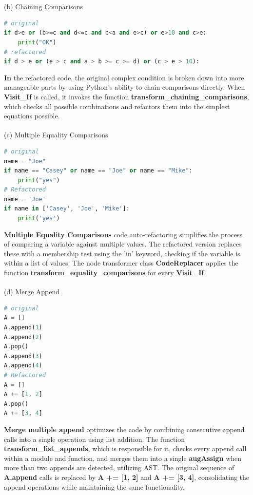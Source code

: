\documentclass[11pt]{article}
\begin{document}
\\ \\
(b) Chaining Comparisons
\begin{lstlisting}[language=python]
# original
if d>e or (b>=c and d<=c and b<a and e>c) or e>10 and c>e:
    print("OK")
# refactored
if d > e or (e > c and a > b >= c >= d) or (c > e > 10):
\end{lstlisting}
\textbf {In} the refactored code, the original complex condition is broken down into more manageable parts by using Python's ability to chain comparisons directly. When \textbf{Visit\_If} is called, it invokes the function \textbf{transform\_chaining\_comparisons}, which checks all possible combinations and refactors them into the simplest equations possible.\\ \\
(c) Multiple Equality Comparisons
\begin{lstlisting}[language=python]
# original
name = "Joe"
if name == "Casey" or name == "Joe" or name == "Mike":
    print("yes")
# Refactored
name = 'Joe'
if name in ['Casey', 'Joe', 'Mike']:
    print('yes')
\end{lstlisting}
\textbf{Multiple Equality Comparisons} code auto-refactoring simplifies the process of comparing a variable against multiple values. The refactored version replaces these with a membership test using the 'in' keyword, checking if the variable is within a list of values. The node transformer class \textbf{CodeReplacer} applies the function \textbf{transform\_equality\_comparisons} for every \textbf{Visit\_If}. \\ \\
(d) Merge Append
\begin{lstlisting}[language=python]
# original
A = []
A.append(1)
A.append(2)
A.pop()
A.append(3)
A.append(4)
# Refactored
A = []
A += [1, 2]
A.pop()
A += [3, 4]
\end{lstlisting}
\textbf{Merge multiple append} optimizes the code by combining consecutive append calls into a single operation using list addition. The function \textbf{transform\_list\_appends}, which is responsible for it, checks every append call within a module and function, and merges them into a single \textbf{augAssign} when more than two appends are detected, utilizing AST. The original sequence of \textbf{A.append} calls is replaced by \textbf{A += [1, 2]} and \textbf{A += [3, 4]}, consolidating the append operations while maintaining the same functionality. \\ \\
\end{document}
